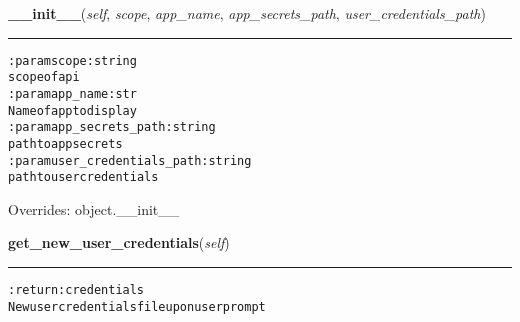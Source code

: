     \vspace{0.5ex}

\hspace{.8\funcindent}\begin{boxedminipage}{\funcwidth}

    \raggedright \textbf{\_\_init\_\_}(\textit{self}, \textit{scope}, \textit{app\_name}, \textit{app\_secrets\_path}, \textit{user\_credentials\_path})

    \vspace{-1.5ex}

    \rule{\textwidth}{0.5\fboxrule}
\setlength{\parskip}{2ex}
\begin{alltt}

:param scope: string
    scope of api
:param app\_name: str
    Name of app to display
:param app\_secrets\_path: string
    path to app secrets
:param user\_credentials\_path: string
    path to user credentials
\end{alltt}

\setlength{\parskip}{1ex}
      Overrides: object.\_\_init\_\_

    \end{boxedminipage}

    \label{hal:internet:google:gauthenticator:GoogleApiOAuth:get_new_user_credentials}

    \vspace{0.5ex}

\hspace{.8\funcindent}\begin{boxedminipage}{\funcwidth}

    \raggedright \textbf{get\_new\_user\_credentials}(\textit{self})

    \vspace{-1.5ex}

    \rule{\textwidth}{0.5\fboxrule}
\setlength{\parskip}{2ex}
\begin{alltt}

:return: credentials
    New user credentials file upon user prompt
\end{alltt}

\setlength{\parskip}{1ex}
    \end{boxedminipage}

